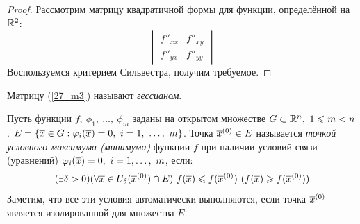 \begin{proof}
	Рассмотрим матрицу квадратичной формы для функции, определённой на $\mathbb{R}^2$:
	\begin{equation}\label{27_m3}
		\begin{vmatrix}
			f''_{xx} & f''_{xy} \\
			f''_{yx} & f''_{yy}
		\end{vmatrix}
	\end{equation}
	Воспользуемся критерием Сильвестра, получим требуемое.
\end{proof}
\begin{note}
	Матрицу (\ref{27_m3}) называют \textit{гессианом}.
\end{note}
\begin{definition}
	Пусть функции $f,\ \phi_1,\ \dots,\ \phi_m$ заданы на открытом множестве $G\subset\R^n,\ 1\le m<n$. $E=\{\overline x\in G:\varphi_i(\overline x)=0,\ i=1,\ \dots,\ m\}$. Точка $\overline x^{({0})}\in E$ называется \textit{точкой условного максимума (минимума)} функции $f$ при наличии условий связи (уравнений) $\varphi_i(\overline x)=0,\ i=1,\dots,\ m$, если:
	\[(\exists\delta>0)(\forall \overline x\in U_\delta(\overline x^{({0})})\cap E)\ f(\overline x)\leqslant f(\overline x^{({0})})\ (f(\overline x)\geqslant f(\overline x^{({0})}))\]
	Заметим, что все эти условия автоматически выполняются, если точка $\overline x^{({0})}$ является изолированной для множества $E$.
\end{definition}
